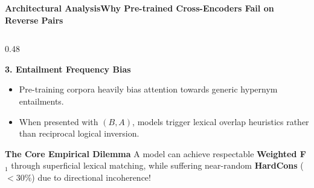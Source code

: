 \documentclass[aspectratio=169,10pt]{beamer}
\begin{document}
\begin{frame}{\textbf{Architectural Analysis}}{\textbf{Why Pre-trained Cross-Encoders Fail on Reverse Pairs}}
\begin{columns}[T]
    \begin{column}{0.48\textwidth}
      \begin{block}{\textbf{3. Entailment Frequency Bias}}
        \footnotesize
        \begin{itemize}\setlength{\itemsep}{1pt}\setlength{\parskip}{0pt}
          \item Pre-training corpora heavily bias attention towards generic hypernym entailments.
          \item When presented with $(B, A)$, models trigger lexical overlap heuristics rather than reciprocal logical inversion.
        \end{itemize}
      \end{block}
      \vspace{0.05cm}
      \begin{alertblock}{\textbf{The Core Empirical Dilemma}}
        \footnotesize
        A model can achieve respectable \textbf{Weighted F$_1$} through superficial lexical matching, while suffering near-random \textbf{HardCons} ($< 30\%$) due to directional incoherence!
      \end{alertblock}
    \end{column}
  \end{columns}
\end{frame}
\end{document}
